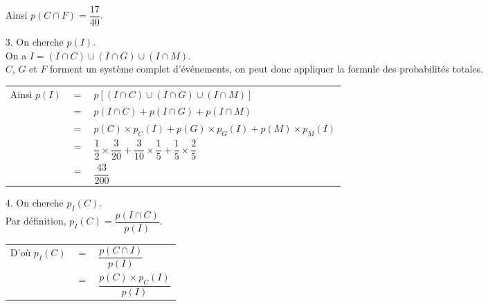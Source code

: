 \begin{itemize}
Ainsi $p\left(C\cap F\right) = \dfrac{17}{40}$. \vspace*{.3cm} \\

\item[3.] On cherche $p\left(I\right)$. \vspace*{.3cm} \\

On a $I = \left(I \cap C\right) \cup \left(I \cap G\right) \cup \left(I \cap M\right)$. \vspace*{.3cm} \\

$C$, $G$ et $F$ forment un système complet d'événements, on peut donc appliquer la formule des probabilités totales. \\

\begin{tabular}{lll}
\hspace{-.3cm} Ainsi $p\left(I\right)$ & $=$ & $p\left[\left(I \cap C\right) \cup \left(I \cap G\right) \cup \left(I \cap M\right)\right]$ \vspace*{.3cm} \\
& $=$ & $p\left(I \cap C\right) + p\left(I \cap G\right) + p\left(I \cap M\right)$ \vspace*{.3cm} \\
& $=$ & $p\left(C\right) \times p_C\left(I\right) + p\left(G\right) \times p_G\left(I\right) + p\left(M\right) \times p_M\left(I\right)$ \vspace*{.3cm} \\
& $=$ & $\dfrac{1}{2} \times \dfrac{3}{20} + \dfrac{3}{10} \times \dfrac{1}{5} + \dfrac{1}{5} \times \dfrac{2}{5}$ \vspace*{.3cm} \\
& $=$ & $\dfrac{43}{200}$ \\
\end{tabular}

\newpage

\item[4.] On cherche $p_I\left(C\right)$. \vspace*{.3cm} \\

Par définition, $p_I\left(C\right) = \dfrac{p\left(I \cap C\right)}{p\left(I\right)}$. \vspace*{.3cm} \\

\begin{tabular}{lll}
\hspace*{-.3cm} D'où $p_I\left(C\right)$ & $ = $ & $ \dfrac{p\left(C \cap I\right)}{p\left(I\right)}$ \vspace*{.3cm} \\
& $=$ & $\dfrac{p\left(C\right) \times p_C\left(I\right)}{p\left(I\right)}$ \\
\end{tabular}


\end{itemize}
